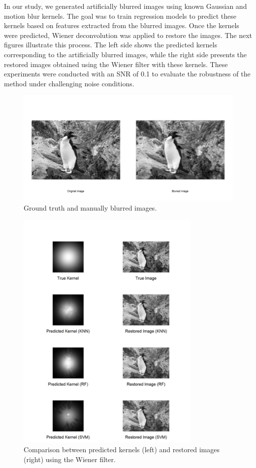\documentclass[twoside,11pt]{article}
\begin{document}
In our study, we generated artificially blurred images using known Gaussian and motion blur kernels. The goal was to train regression models to predict these kernels based on features extracted from the blurred images. Once the kernels were predicted, Wiener deconvolution was applied to restore the images.
The next figures illustrate this process. The left side shows the predicted kernels corresponding to the artificially blurred images, while the right side presents the restored images obtained using the Wiener filter with these kernels. These experiments were conducted with an SNR of 0.1 to evaluate the robustness of the method under challenging noise conditions.
\begin{figure}[H]
\centering
\includegraphics[width=1\textwidth]{figure8.png}
\caption{Ground truth and manually blurred images.}
\end{figure}

\begin{figure}[H]
\centering
\includegraphics[width=0.8\textwidth]{figure9.png}
\caption{Comparison between predicted kernels (left) and restored images (right) using the Wiener filter.}
\label{fig:predicted_vs_restored}
\end{figure}
\end{document}
